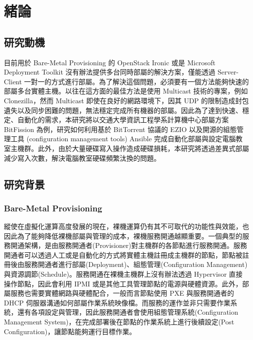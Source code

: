 \chapter{緒論}
\label{c:intro}
\section{研究動機}

目前用於 Bare-Metal Provisioning 的 OpenStack Ironic 或是 Microsoft Deployment Toolkit 沒有辦法提供多台同時部屬的解決方案，僅能透過 Server-Client 一對一的方式進行部屬。為了解決這個問題，必須要有一個方法能夠快速的部屬多台實體主機。以往在這方面的最佳方法是使用 Multicast 技術的專案，例如 Clonezilla\cite{shiau2008clonezilla}，然而 Multicast 即使在良好的網路環境下，因其 UDP 的限制造成封包遺失以及同步困難的問題，無法穩定完成所有機器的部屬。因此為了達到快速、穩定、自動化的需求，本研究將以交通大學資訊工程學系計算機中心部屬方案 BitFission 為例，研究如何利用基於 BitTorrent 協議的 EZIO 以及開源的組態管理工具 (configuration management tools) Ansible 完成自動化部屬與設定電腦教室主機群。此外，由於大量硬碟寫入操作造成硬碟損耗，本研究將透過差異式部屬減少寫入次數，解決電腦教室硬碟頻繁汰換的問題。

\begin{comment}
透過 VHD on Windows、 LVM on Linux 的 Snapshot 功能 保留完整的 base image ，可做為下次部屬的 source image。
\end{comment}

\section{研究背景}
\subsection{Bare-Metal Provisioning}
縱使在虛擬化運算高度發展的現在，裸機運算仍有其不可取代的功能性與效能，也因此為了能夠降低裸機部屬與管理的成本，裸機服務開通越顯重要。一個典型的服務開通架構，是由服務開通者(Provisioner)對主機群的各節點進行服務開通。服務開通者可以透過人工或是自動化的方式將實體主機註冊成主機群的節點，節點被註冊後由服務開通者進行部屬(Deployment)、組態管理(Configuration Management)與資源調節(Schedule)。服務開通在裸機主機群上沒有辦法透過 Hypervisor 直接操作節點，因此會利用 IPMI 或是其他工具管理節點的電源與硬體資源。此外，部屬服務也需要實體網路與硬體配合，一般而言節點使用 PXE 與服務開通者的 DHCP 伺服器溝通如何部屬作業系統映像檔。而服務的運作並非只需要作業系統，還有各項設定與管理，因此服務開通者會使用組態管理系統(Configuration Management System)，在完成部署後在節點的作業系統上進行後續設定(Post Configuration)，讓節點能夠運行目標作業。
